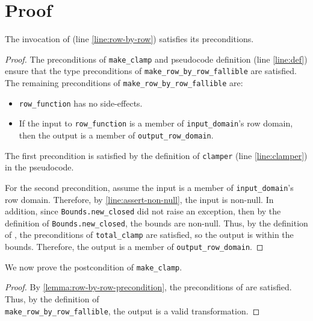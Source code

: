 \documentclass{article}
\begin{document}
\section{Proof}

\begin{lemma}
    The invocation of  (line \ref{line:row-by-row}) satisfies its preconditions.
\end{lemma}

\begin{proof}
    \label{lemma:row-by-row-precondition}
    The preconditions of \texttt{make\_clamp} and pseudocode definition (line \ref{line:def}) ensure that the type preconditions of \texttt{make\_row\_by\_row\_fallible} are satisfied. 
    The remaining preconditions of \texttt{make\_row\_by\_row\_fallible} are:
    \begin{itemize}
        \item \texttt{row\_function} has no side-effects.
        \item If the input to \texttt{row\_function} is a member of \texttt{input\_domain}'s row domain, then the output is a member of \texttt{output\_row\_domain}.
    \end{itemize}

    The first precondition is satisfied by the definition of \texttt{clamper} (line \ref{line:clamper}) in the pseudocode.

    For the second precondition, assume the input is a member of \texttt{input\_domain}'s row domain. 
    Therefore, by \ref{line:assert-non-null}, the input is non-null.
    In addition, since \texttt{Bounds.new\_closed} did not raise an exception, then by the definition of \texttt{Bounds.new\_closed}, the bounds are non-null.
    Thus, by the definition of , the preconditions of \texttt{total\_clamp} are satisfied, so the output is within the bounds.
    Therefore, the output is a member of \texttt{output\_row\_domain}.
\end{proof}

We now prove the postcondition of \texttt{make\_clamp}.
\begin{proof}
By \ref{lemma:row-by-row-precondition}, the preconditions of  are satisfied.
Thus, by the definition of \\\texttt{make\_row\_by\_row\_fallible}, the output is a valid transformation.
\end{proof}
\end{document}
